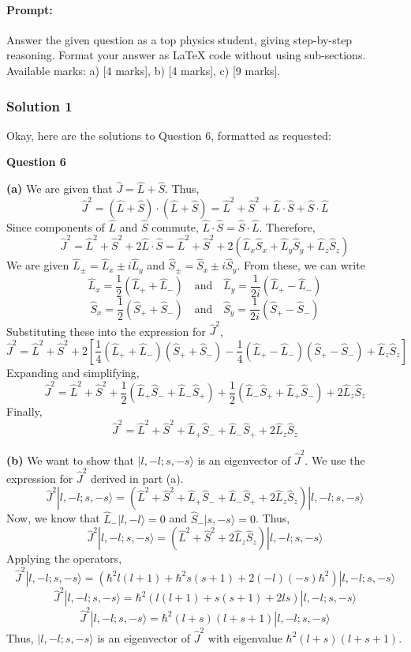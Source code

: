 \documentclass{article}
\begin{document}
\paragraph{Prompt: \\} 
Answer the given question as a top physics student, giving step-by-step reasoning. Format your answer as LaTeX code without using sub-sections. Available marks: a) [4 marks], b) [4 marks], c) [9 marks].

\subsubsection{Solution 1}
Okay, here are the solutions to Question 6, formatted as requested:

\textbf{Question 6}

\textbf{(a)} We are given that $\hat{J} = \hat{L} + \hat{S}$. Thus,
\[
\hat{J}^2 = (\hat{L} + \hat{S}) \cdot (\hat{L} + \hat{S}) = \hat{L}^2 + \hat{S}^2 + \hat{L} \cdot \hat{S} + \hat{S} \cdot \hat{L}
\]
Since components of \(\hat{L}\) and \(\hat{S}\) commute, \(\hat{L} \cdot \hat{S} = \hat{S} \cdot \hat{L}\). Therefore,
\[
\hat{J}^2 = \hat{L}^2 + \hat{S}^2 + 2 \hat{L} \cdot \hat{S} = \hat{L}^2 + \hat{S}^2 + 2(\hat{L}_x \hat{S}_x + \hat{L}_y \hat{S}_y + \hat{L}_z \hat{S}_z)
\]
We are given \(\hat{L}_\pm = \hat{L}_x \pm i \hat{L}_y\) and \(\hat{S}_\pm = \hat{S}_x \pm i \hat{S}_y\). From these, we can write
\[
\hat{L}_x = \frac{1}{2} (\hat{L}_+ + \hat{L}_-) \quad \text{and} \quad \hat{L}_y = \frac{1}{2i} (\hat{L}_+ - \hat{L}_-)
\]
\[
\hat{S}_x = \frac{1}{2} (\hat{S}_+ + \hat{S}_-) \quad \text{and} \quad \hat{S}_y = \frac{1}{2i} (\hat{S}_+ - \hat{S}_-)
\]
Substituting these into the expression for $\hat{J}^2$,
\[
\hat{J}^2 = \hat{L}^2 + \hat{S}^2 + 2\left[\frac{1}{4} (\hat{L}_+ + \hat{L}_-)(\hat{S}_+ + \hat{S}_-) - \frac{1}{4} (\hat{L}_+ - \hat{L}_-)(\hat{S}_+ - \hat{S}_-) + \hat{L}_z \hat{S}_z\right]
\]
Expanding and simplifying,
\[
\hat{J}^2 = \hat{L}^2 + \hat{S}^2 + \frac{1}{2} (\hat{L}_+ \hat{S}_- + \hat{L}_- \hat{S}_+) + \frac{1}{2} (\hat{L}_- \hat{S}_+ + \hat{L}_+ \hat{S}_-) + 2 \hat{L}_z \hat{S}_z
\]
Finally,
\[
\hat{J}^2 = \hat{L}^2 + \hat{S}^2 + \hat{L}_+ \hat{S}_- + \hat{L}_- \hat{S}_+ + 2 \hat{L}_z \hat{S}_z
\]

\textbf{(b)} We want to show that \(|l, -l; s, -s\rangle\) is an eigenvector of \(\hat{J}^2\). We use the expression for \(\hat{J}^2\) derived in part (a).
\[
\hat{J}^2 |l, -l; s, -s\rangle = (\hat{L}^2 + \hat{S}^2 + \hat{L}_+ \hat{S}_- + \hat{L}_- \hat{S}_+ + 2 \hat{L}_z \hat{S}_z) |l, -l; s, -s\rangle
\]
Now, we know that \(\hat{L}_- |l, -l\rangle = 0\) and \(\hat{S}_- |s, -s\rangle = 0\). Thus,
\[
\hat{J}^2 |l, -l; s, -s\rangle = (\hat{L}^2 + \hat{S}^2 + 2 \hat{L}_z \hat{S}_z) |l, -l; s, -s\rangle
\]
Applying the operators,
\[
\hat{J}^2 |l, -l; s, -s\rangle = (\hbar^2 l(l+1) + \hbar^2 s(s+1) + 2(-l)(-s)\hbar^2) |l, -l; s, -s\rangle
\]
\[
\hat{J}^2 |l, -l; s, -s\rangle = \hbar^2 (l(l+1) + s(s+1) + 2ls) |l, -l; s, -s\rangle
\]
\[
\hat{J}^2 |l, -l; s, -s\rangle = \hbar^2 (l+s)(l+s+1) |l, -l; s, -s\rangle
\]
Thus, \(|l, -l; s, -s\rangle\) is an eigenvector of \(\hat{J}^2\) with eigenvalue \(\hbar^2 (l+s)(l+s+1)\).
\end{document}
